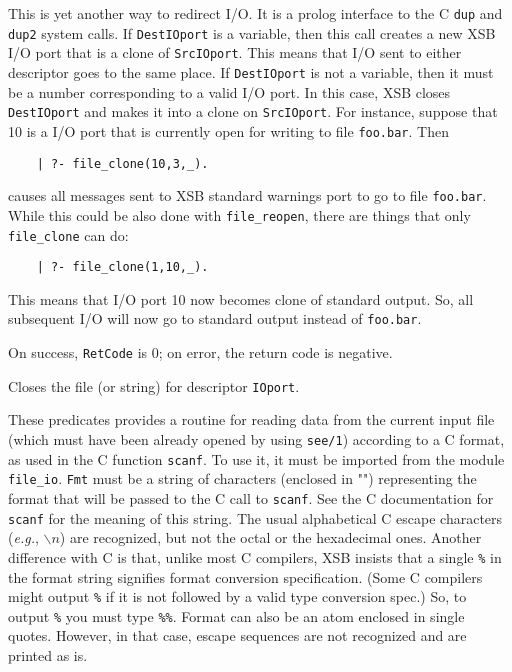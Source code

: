 \begin{description}
    This is yet another way to redirect I/O. It is a prolog interface to
    the C {\tt dup} and {\tt dup2} system calls. If {\tt DestIOport} is a
    variable, then this call creates a new XSB I/O port that is a
    clone of {\tt SrcIOport}. This means that I/O sent to either
    descriptor goes to the same place. If {\tt DestIOport} is not a
    variable, then it must be a number corresponding to a valid I/O
    port. In this case, XSB closes {\tt DestIOport} and makes it 
    into a clone on {\tt SrcIOport}. For instance, suppose that 10 is a
    I/O port that is currently open for writing to file {\tt foo.bar}.
    Then
    \begin{verbatim}
    | ?- file_clone(10,3,_).      
    \end{verbatim}
    causes all messages sent to XSB standard warnings port to go to file
    {\tt foo.bar}. While this could be also done with {\tt file\_reopen},
    there are things that only {\tt file\_clone} can do:
    \begin{verbatim}
    | ?- file_clone(1,10,_).      
    \end{verbatim}
    This means that I/O port 10 now becomes clone of standard
    output. So, all subsequent I/O will now go to standard output instead
    of {\tt foo.bar}. 

    On success, {\tt RetCode} is 0; on error, the return code is negative.

    Closes the file (or string) for descriptor {\tt IOport}.

\vspace{-7mm}
    These predicates provides a routine for reading data from
    the current input file (which must have been already opened by using
    {\tt see/1}) according to a C format, as used in the C function
    {\tt scanf}. To use it, it must be imported from the module {\tt
    file\_io}.  {\tt Fmt} must be a string of characters (enclosed in "")
    representing the format that 
    will be passed to the C call to {\tt scanf}.  See the C
    documentation for {\tt scanf} for the meaning of this string.
    The usual alphabetical C escape characters ({\it e.g.}, $\backslash n$)
    are recognized, but not the octal or the hexadecimal ones.
    Another difference with C is that, unlike most C compilers, XSB insists
    that a single {\tt \%} in the format string signifies format conversion
    specification. (Some C compilers might output {\tt \%} if it is not
    followed by a valid type conversion spec.) So, to output {\tt \%}
    you must type {\tt \%\%}.
    Format can also be an atom enclosed in single quotes. However, in that
    case, escape sequences are not recognized and are printed as is.


\end{description}
